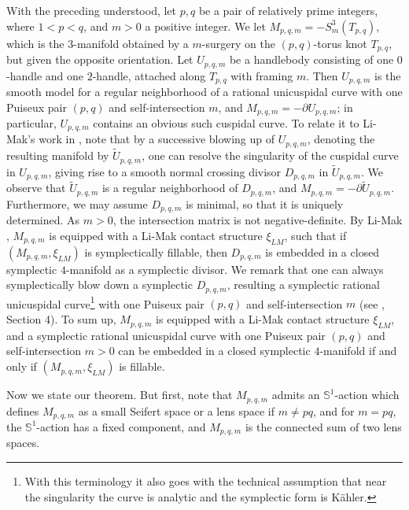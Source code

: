 \documentclass[11pt]{amsart}
\theoremstyle{plain}
\numberwithin{theorem}{section}
\theoremstyle{definition}
\newcommand{\s}{{\mathbb S}}
\begin{document}
With the preceding understood, let $p,q$ be a pair of relatively prime integers, where $1<p<q$, and $m>0$ a positive integer. We let $M_{p,q,m}=-S^3_m(T_{p,q})$, which is the $3$-manifold obtained by a $m$-surgery on the $(p,q)$-torus knot $T_{p,q}$, but given the opposite orientation. Let $U_{p,q,m}$ be a handlebody consisting of one $0$-handle and one $2$-handle, attached along $T_{p,q}$ with framing $m$. Then $U_{p,q,m}$ is the smooth model for a regular neighborhood of a rational unicuspidal curve with one Puiseux pair $(p,q)$ and self-intersection $m$, and $M_{p,q,m}=-\partial U_{p,q,m}$; in particular, $U_{p,q,m}$ contains an obvious such 
cuspidal curve. To relate it to Li-Mak's work in \cite{LM}, note that by a successive blowing up of $U_{p,q,m}$, denoting the resulting manifold by $\tilde{U}_{p,q,m}$, one can resolve the singularity of the cuspidal curve in $U_{p,q,m}$, giving rise to a smooth normal crossing divisor $D_{p,q,m}$ in $\tilde{U}_{p,q,m}$. We observe
 that $\tilde{U}_{p,q,m}$ is a regular neighborhood of $D_{p,q,m}$, and $M_{p,q,m}=-\partial \tilde{U}_{p,q,m}$. Furthermore, we may assume $D_{p,q,m}$ is minimal, so that it is uniquely determined. As $m>0$, the intersection matrix is not negative-definite. By Li-Mak \cite{LM}, $M_{p,q,m}$ is equipped with a Li-Mak contact structure 
 $\xi_{LM}$, such that if $(M_{p,q,m}, \xi_{LM})$ is symplectically fillable, then $D_{p,q,m}$ is embedded in a closed symplectic $4$-manifold as a symplectic divisor. We remark that one can always symplectically blow down a symplectic $D_{p,q,m}$, resulting a symplectic rational unicuspidal curve\footnote{With this terminology it also goes with the technical assumption that near the singularity the curve is analytic and the symplectic form is 
K\"{a}hler.} with one Puiseux pair $(p,q)$ and self-intersection $m$ (see \cite{C2}, Section 4). To sum up, $M_{p,q,m}$ is equipped with a Li-Mak contact structure $\xi_{LM}$, and a symplectic rational unicuspidal curve with one Puiseux pair $(p,q)$ and self-intersection $m>0$ can be embedded in a closed symplectic $4$-manifold if and only if $(M_{p,q,m}, \xi_{LM})$ is fillable. 

Now we state our theorem. But first, note that $M_{p,q,m}$ admits an $\s^1$-action which defines $M_{p,q,m}$
as a small Seifert space or a lens space if $m\neq pq$, and for $m=pq$, the $\s^1$-action has a fixed component, and $M_{p,q,m}$ is the connected sum of two lens spaces. 
\end{document}
